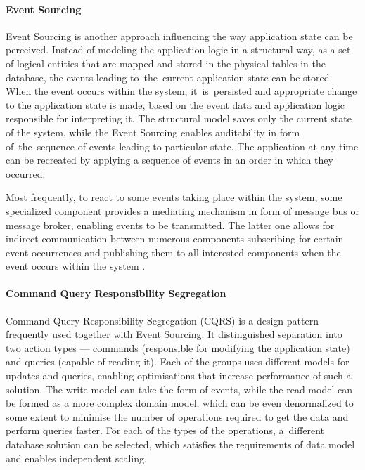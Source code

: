 \paragraph{Event Sourcing} \label{chapter:event-driven-sourcing}

Event Sourcing is another approach influencing the way application state can be perceived. Instead of modeling the application logic in a structural way, as a set of logical entities that are mapped and stored in the physical tables in the database, the events leading to~the~current application state can be stored. When the event occurs within the system, it~is~persisted and appropriate change to the application state is made, based on the event data and application logic responsible for interpreting it. The structural model saves only the current state of the system, while the Event Sourcing enables auditability in form of~the~sequence of events leading to particular state. The application at any time can be recreated by applying a sequence of events in an order in which they occurred.

Most frequently, to react to some events taking place within the system, some specialized component provides a mediating mechanism in form of message bus or message broker, enabling events to be transmitted. The latter one allows for indirect communication between numerous components subscribing for certain event occurrences and publishing them to all interested components when the event occurs within the system \cite{MicroservicesArchitecture}.

\paragraph{Command Query Responsibility Segregation}

Command Query Responsibility Segregation (CQRS) is a design pattern frequently used together with Event Sourcing. It distinguished separation into two action types --- commands (responsible for modifying the application state) and queries (capable of reading it). Each of the groups uses different models for updates and queries, enabling optimisations that increase performance of such a solution. The write model can take the form of events, while the read model can be formed as a more complex domain model, which can be even denormalized to some extent to minimise the number of operations required to get the data and perform queries faster. For each of the types of the operations, a~different database solution can be selected, which satisfies the requirements of data model and enables independent scaling.

